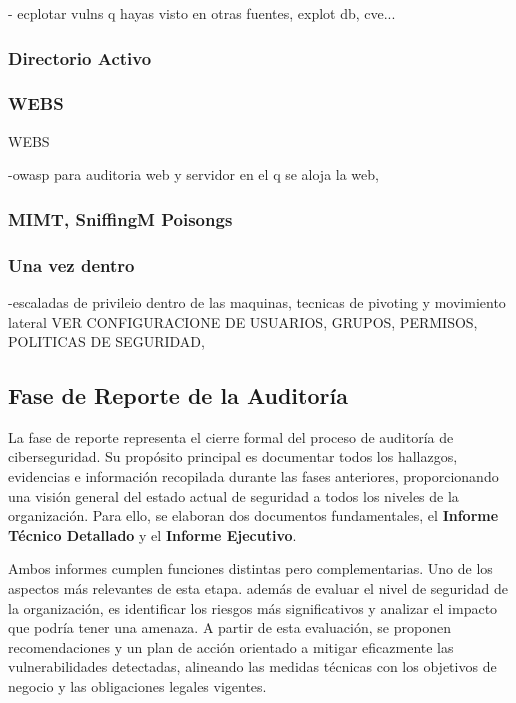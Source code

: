 \documentclass[a4paper, 11pt]{article}
\begin{document}
- ecplotar vulns q hayas visto en otras fuentes, explot db, cve...

\subsubsection{Directorio Activo}



\subsubsection{WEBS}

WEBS

-owasp para auditoria web y servidor en el q se aloja la web,

\subsubsection{MIMT, SniffingM Poisongs}


\subsubsection{Una vez dentro}

-escaladas de privileio dentro de las maquinas, tecnicas de pivoting y movimiento lateral
 VER CONFIGURACIONE DE USUARIOS, GRUPOS, PERMISOS, POLITICAS DE SEGURIDAD,



\clearpage




\subsection{Fase de Reporte de la Auditoría}

La fase de reporte representa el cierre formal del proceso de auditoría de ciberseguridad. 
Su propósito principal es documentar todos los hallazgos, evidencias e información recopilada durante las fases anteriores,
 proporcionando una visión general del estado actual de seguridad a todos los niveles de la organización. Para ello,
 se elaboran dos documentos fundamentales, el \textbf{Informe Técnico Detallado} y el \textbf{Informe Ejecutivo}. 




Ambos informes cumplen funciones distintas pero complementarias. Uno de los aspectos más relevantes de esta etapa. además de evaluar el nivel de seguridad de la organización, 
es identificar los riesgos más significativos y analizar el impacto que podría tener una amenaza. A partir de esta evaluación, se proponen recomendaciones y un plan de acción orientado a mitigar eficazmente las vulnerabilidades detectadas, alineando las medidas técnicas con los objetivos de negocio y las obligaciones legales vigentes.
\end{document}
